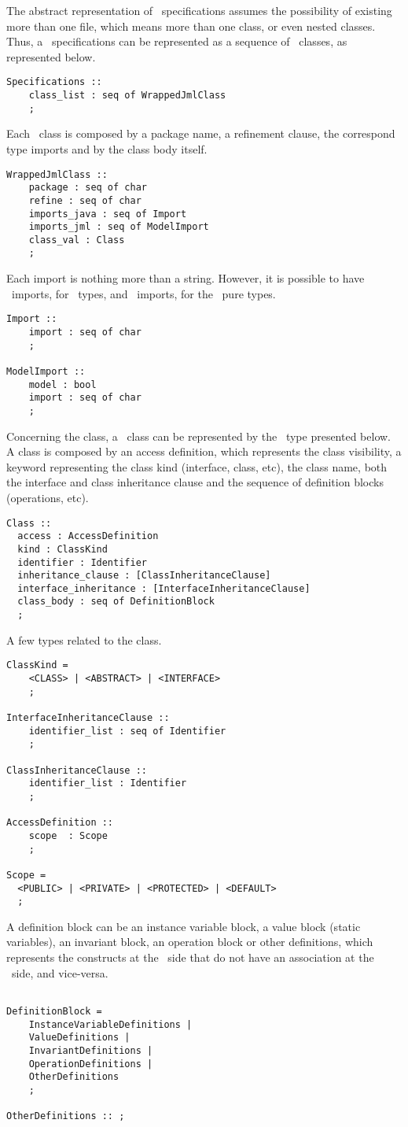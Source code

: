 The abstract representation of \jml\ specifications assumes the possibility of existing more than one file, which means more than one class, or even nested classes. Thus, a \jml\ specifications can be represented as a sequence of \jml\ classes, as represented below.
\lstset{style=AST}
\lstset{language=VDM++}
\medskip
\begin{lstlisting}
Specifications ::
	class_list : seq of WrappedJmlClass
	;
\end{lstlisting}
\medskip
Each \jml\ class is composed by a package name, a refinement clause, the correspond type imports and by the class body itself.
\medskip
\begin{lstlisting}
WrappedJmlClass ::
	package : seq of char
	refine : seq of char
	imports_java : seq of Import
	imports_jml : seq of ModelImport
	class_val : Class
	;
\end{lstlisting}
\medskip
Each import is nothing more than a string. However, it is possible to have \java\ imports, for \java\ types, and \jml\ imports, for the \jml\ pure types.
\medskip
\begin{lstlisting}
Import ::
	import : seq of char
	;

ModelImport ::
	model : bool
	import : seq of char
	;
\end{lstlisting}
\medskip
Concerning the class, a \jml\ class can be represented by the \vdm\ type presented below. A class is composed by an access definition, which represents the class visibility, a keyword representing the class kind (interface, class, etc), the class name, both the interface and class inheritance clause and the sequence of definition blocks (operations, etc).
\medskip
\begin{lstlisting}
Class ::
  access : AccessDefinition
  kind : ClassKind
  identifier : Identifier
  inheritance_clause : [ClassInheritanceClause]
  interface_inheritance : [InterfaceInheritanceClause]
  class_body : seq of DefinitionBlock
  ;
\end{lstlisting}
\medskip
A few types related to the class.
\medskip
\begin{lstlisting}
ClassKind =
	<CLASS> | <ABSTRACT> | <INTERFACE>
	;

InterfaceInheritanceClause ::
	identifier_list : seq of Identifier
	;

ClassInheritanceClause ::
	identifier_list : Identifier
	;

AccessDefinition :: 
	scope  : Scope
	;
  
Scope =
  <PUBLIC> | <PRIVATE> | <PROTECTED> | <DEFAULT>
  ;
\end{lstlisting}
\medskip
A definition block can be an instance variable block, a value block (static variables), an invariant block, an operation block or other definitions, which represents the constructs at the \vpp\ side that do not have an association at the \jml\ side, and vice-versa.
\medskip
\begin{lstlisting}

DefinitionBlock =
	InstanceVariableDefinitions |
	ValueDefinitions |
	InvariantDefinitions | 
	OperationDefinitions |
	OtherDefinitions
	;

OtherDefinitions :: ;

\end{lstlisting}
\medskip

